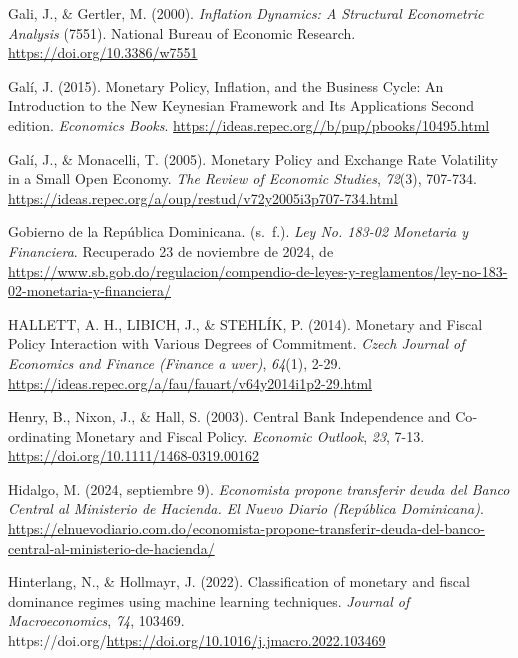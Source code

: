 \documentclass[
  man,
  longtable,
  nolmodern,
  notxfonts,
  notimes,
  colorlinks=true,linkcolor=blue,citecolor=blue,urlcolor=blue]{apa7}
\newlength{\cslhangindent}
\newenvironment{CSLReferences}[2] %
 {\begin{list}{}{%
  \setlength{\itemindent}{0pt}
  \setlength{\leftmargin}{0pt}
  \setlength{\parsep}{0pt}
  \ifodd #1
   \setlength{\leftmargin}{\cslhangindent}
   \setlength{\itemindent}{-1\cslhangindent}
  \fi
  \setlength{\itemsep}{#2\baselineskip}}}
 {\end{list}}
\begin{document}
\begin{CSLReferences}{1}{0}
Gali, J., \& Gertler, M. (2000). \emph{Inflation Dynamics: A Structural
Econometric Analysis} (7551). National Bureau of Economic Research.
\url{https://doi.org/10.3386/w7551}

Galí, J. (2015). Monetary Policy, Inflation, and the Business Cycle: An
Introduction to the New Keynesian Framework and Its Applications Second
edition. \emph{Economics Books}.
\url{https://ideas.repec.org//b/pup/pbooks/10495.html}

Galí, J., \& Monacelli, T. (2005). Monetary Policy and Exchange Rate
Volatility in a Small Open Economy. \emph{The Review of Economic
Studies}, \emph{72}(3), 707-734.
\url{https://ideas.repec.org/a/oup/restud/v72y2005i3p707-734.html}

Gobierno de la República Dominicana. (s.~f.). \emph{Ley No. 183-02
Monetaria y Financiera}. Recuperado 23 de noviembre de 2024, de
\url{https://www.sb.gob.do/regulacion/compendio-de-leyes-y-reglamentos/ley-no-183-02-monetaria-y-financiera/}

HALLETT, A. H., LIBICH, J., \& STEHLÍK, P. (2014). Monetary and Fiscal
Policy Interaction with Various Degrees of Commitment. \emph{Czech
Journal of Economics and Finance (Finance a uver)}, \emph{64}(1), 2-29.
\url{https://ideas.repec.org/a/fau/fauart/v64y2014i1p2-29.html}

Henry, B., Nixon, J., \& Hall, S. (2003). Central Bank Independence and
Co‐ordinating Monetary and Fiscal Policy. \emph{Economic Outlook},
\emph{23}, 7-13. \url{https://doi.org/10.1111/1468-0319.00162}

Hidalgo, M. (2024, septiembre 9). \emph{Economista propone transferir
deuda del Banco Central al Ministerio de Hacienda. El Nuevo Diario
(República Dominicana)}.
\url{https://elnuevodiario.com.do/economista-propone-transferir-deuda-del-banco-central-al-ministerio-de-hacienda/}

Hinterlang, N., \& Hollmayr, J. (2022). Classification of monetary and
fiscal dominance regimes using machine learning techniques.
\emph{Journal of Macroeconomics}, \emph{74}, 103469.
https://doi.org/\url{https://doi.org/10.1016/j.jmacro.2022.103469}


\end{CSLReferences}
\end{document}
